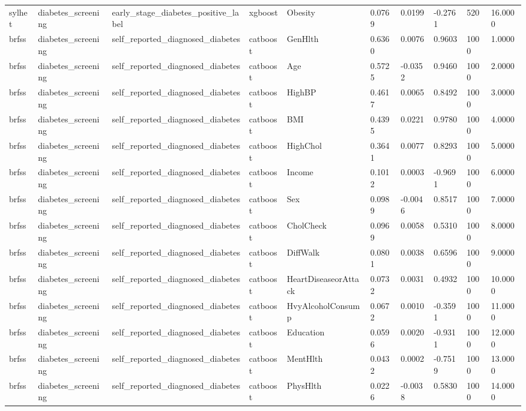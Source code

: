 \begin{tabular}{llllllllll}
sylhet & diabetes\_screening & early\_stage\_diabetes\_positive\_label & xgboost & Obesity & 0.0769 & 0.0199 & -0.2761 & 520 & 16.0000 \\
brfss & diabetes\_screening & self\_reported\_diagnosed\_diabetes & catboost & GenHlth & 0.6360 & 0.0076 & 0.9603 & 1000 & 1.0000 \\
brfss & diabetes\_screening & self\_reported\_diagnosed\_diabetes & catboost & Age & 0.5725 & -0.0352 & 0.9460 & 1000 & 2.0000 \\
brfss & diabetes\_screening & self\_reported\_diagnosed\_diabetes & catboost & HighBP & 0.4617 & 0.0065 & 0.8492 & 1000 & 3.0000 \\
brfss & diabetes\_screening & self\_reported\_diagnosed\_diabetes & catboost & BMI & 0.4395 & 0.0221 & 0.9780 & 1000 & 4.0000 \\
brfss & diabetes\_screening & self\_reported\_diagnosed\_diabetes & catboost & HighChol & 0.3641 & 0.0077 & 0.8293 & 1000 & 5.0000 \\
brfss & diabetes\_screening & self\_reported\_diagnosed\_diabetes & catboost & Income & 0.1012 & 0.0003 & -0.9691 & 1000 & 6.0000 \\
brfss & diabetes\_screening & self\_reported\_diagnosed\_diabetes & catboost & Sex & 0.0989 & -0.0046 & 0.8517 & 1000 & 7.0000 \\
brfss & diabetes\_screening & self\_reported\_diagnosed\_diabetes & catboost & CholCheck & 0.0969 & 0.0058 & 0.5310 & 1000 & 8.0000 \\
brfss & diabetes\_screening & self\_reported\_diagnosed\_diabetes & catboost & DiffWalk & 0.0801 & 0.0038 & 0.6596 & 1000 & 9.0000 \\
brfss & diabetes\_screening & self\_reported\_diagnosed\_diabetes & catboost & HeartDiseaseorAttack & 0.0732 & 0.0031 & 0.4932 & 1000 & 10.0000 \\
brfss & diabetes\_screening & self\_reported\_diagnosed\_diabetes & catboost & HvyAlcoholConsump & 0.0672 & 0.0010 & -0.3591 & 1000 & 11.0000 \\
brfss & diabetes\_screening & self\_reported\_diagnosed\_diabetes & catboost & Education & 0.0596 & 0.0020 & -0.9311 & 1000 & 12.0000 \\
brfss & diabetes\_screening & self\_reported\_diagnosed\_diabetes & catboost & MentHlth & 0.0432 & 0.0002 & -0.7519 & 1000 & 13.0000 \\
brfss & diabetes\_screening & self\_reported\_diagnosed\_diabetes & catboost & PhysHlth & 0.0226 & -0.0038 & 0.5830 & 1000 & 14.0000 \\

\end{tabular}

